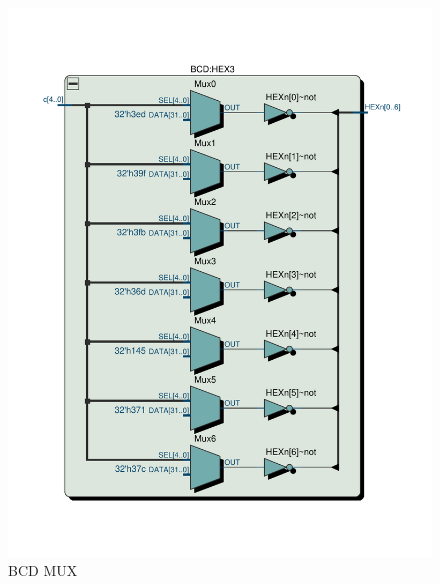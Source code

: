 \documentclass[13pt,a4paper]{report}
\begin{document}
\begin{figure}[H]
\centering
\includegraphics[scale=0.5, clip, trim={0cm 3cm 0cm 3.3cm}]{images/Exc2_BCD_RTL.pdf}
\caption*{BCD MUX}
\end{figure}
\end{document}
